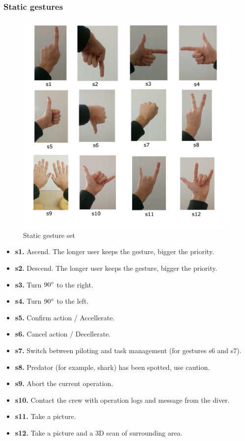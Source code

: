 \documentclass[a4paper,11pt,oneside]{article}
\begin{document}
    \subsubsection{Static gestures}
    
  \begin{figure}[H]
  \centering
  \includegraphics[scale=0.4]{static-gestureset.png}
  \caption{Static gesture set}
  \end{figure}
    
    \begin{itemize}
    \item \textbf{s1.} Ascend. The longer user keeps the gesture, bigger the priority.
    \item \textbf{s2.} Descend. The longer user keeps the gesture, bigger the priority.
    \item \textbf{s3.} Turn $90\degree$ to the right.
    \item \textbf{s4.} Turn $90\degree$ to the left.
    \item \textbf{s5.} Confirm action / Accellerate.
    \item \textbf{s6.} Cancel action / Decellerate.
    \item \textbf{s7.} Switch between piloting and task management (for gestures s6 and s7).
    \item \textbf{s8.} Predator (for example, shark) has been spotted, use caution.
    \item \textbf{s9.} Abort the current operation.
    \item \textbf{s10.} Contact the crew with operation logs and message from the diver.
    \item \textbf{s11.} Take a picture.
    \item \textbf{s12.} Take a picture and a 3D scan of surrounding area.
    \end{itemize}
    
\end{document}
